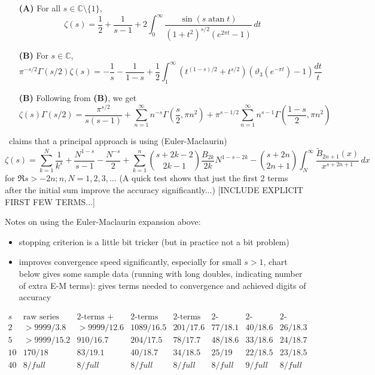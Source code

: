 \documentclass[10pt,dvipdfmx,letterpaper,twoside]{article}
\DeclareMathOperator{\atan}{atan}
\newcommand{\CC}{{\mathbb{C}}}
\newenvironment{implementation}{\noindent\begin{framed}}{\end{framed}}
\let\Gam=\Gamma
\let\theta=\vartheta
\begin{document}
\begin{implementation}
\begin{itemize}
\item[\bf(A)] For all $s\in\CC\setminus\{1\}$,
  \[ \zeta(s) = \frac12 + \frac{1}{s-1} + 2\int_0^\infty\frac{\sin(s \atan t)}{(1+t^2)^{s/2}(e^{2\pi t}-1)}\,dt \]
\item[\bf(B)] For $s\in\CC$,
  \[ \pi^{-s/2}\Gam(s/2)\zeta(s) = -\frac{1}{s} - \frac{1}{1-s} + \frac12\int_1^\infty(t^{(1-s)/2}+t^{s/2})(\theta_3(e^{-\pi t})-1)\frac{dt}{t} \]
\item[\bf(B)] Following from {\bf(B)}, we get
  \[ \zeta(s)\Gam(s/2) = \frac{\pi^{s/2}}{s(s-1)} + \sum_{n=1}^\infty n^{-s}\Gam(\frac{s}{2}, \pi n^2)
      + \pi^{s-1/2}\sum_{n=1}^\infty n^{s-1}\Gam(\frac{1-s}{2}, \pi n^2) \]
\end{itemize}

\cite{DLMF}~claims that a principal approach is using (Euler-Maclaurin)
\[ \zeta(s) = \sum_{k=1}^N\frac{1}{k^s} + \frac{N^{1-s}}{s-1} - \frac{N^{-s}}{2} + \sum_{k=1}^n\binom{s+2k-2}{2k-1}\frac{B_{2k}}{2k} N^{1-s-2k}
    - \binom{s+2n}{2n+1}\int_N^\infty\frac{\widetilde{B}_{2n+1}(x)}{x^{s+2n+1}}\,dx \]
for $\Re s>-2n; n,N=1,2,3,\dots$  (A quick test shows that just the first 2 terms after the initial sum improve the accuracy significantly...)
[INCLUDE EXPLICIT FIRST FEW TERMS...]

Notes on using the Euler-Maclaurin expansion above:
\begin{itemize}
\item stopping criterion is a little bit tricker (but in practice not a bit problem)
\item improves convergence speed significantly, especially for small $s>1$, chart below gives some sample data
    (running with long doubles, indicating number of extra E-M terms): gives terms needed to convergence and achieved digits of accuracy
\end{itemize}
\end{implementation}
{\small
\[\begin{array}{c|ccccccc} 
s&\text{raw series}&\text{2-terms + n=0}&\text{2-terms + n=1}&\text{2-terms + n=2}&\text{2-terms + n=3}&\text{2-terms + n=4}&\text{2-terms + n=5}\\\hline
2  & >9999/3.8 & >9999/12.6 & 1089/16.5 & 201/17.6 & 77/18.1 & 40/18.6 & 26/18.3 \\
5  & >9999/15.2 & 910/16.7 & 204/17.5 & 78/17.7 & 48/18.6 & 33/18.6 & 24/18.7 \\
10 & 170/18 & 83/19.1 & 40/18.7 & 34/18.5 & 25/19 & 22/18.5 & 23/18.5 \\
40 & 8/full & 8/full & 8/full & 8/full & 8/full & 9/full & 8/full
\end{array}\]
}
\end{document}
